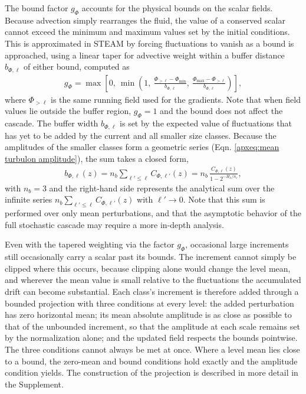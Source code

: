 \documentclass[acp, manuscript, english]{copernicus}
\begin{document}
The bound factor $g_\Phi$ accounts for the physical bounds on the scalar fields. Because advection simply rearranges the fluid, the value of a conserved scalar cannot exceed the minimum and maximum values set by the initial conditions. This is approximated in STEAM by forcing fluctuations to vanish as a bound is approached, using a linear taper for advective weight within a buffer distance $b_{\Phi,\ell}$ of either bound, computed as
\begin{align}
  g_\Phi = \max\left[0,\ \min\left(1,\ \frac{\Phi_{>\ell} - \Phi_{\min}}{b_{\Phi,\ell}},\ \frac{\Phi_{\max} - \Phi_{>\ell}}{b_{\Phi,\ell}}\right)\right], \label{apxeq:bound factor}
\end{align}
where $\Phi_{>\ell}$ is the same running field used for the gradients. Note that when field values lie outside the buffer region, $g_\Phi = 1$ and the bound does not affect the cascade. The buffer width $b_{\Phi,\ell}$ is set by the expected value of fluctuations that has yet to be added by the current and all smaller size classes. Because the amplitudes of the smaller classes form a geometric series (Eqn. \ref{apxeq:mean turbulon amplitude}), the sum takes a closed form,
\begin{align}
  b_{\Phi,\ell}(z) = n_b \sum_{\ell' \le \ell} C_{\Phi,\ell'}(z) = n_b\, \frac{C_{\Phi,\ell}(z)}{1 - 2^{-H_h/n_c}}, \label{apxeq:bound buffer}
\end{align}
with $n_b = 3$ and the right-hand side represents the analytical sum over the infinite series $n_b \sum_{\ell' \le \ell} C_{\Phi,\ell'}(z)$ with $\ell' \to 0$. Note that this sum is performed over only mean perturbations, and that the asymptotic behavior of the full stochastic cascade may require a more in-depth analysis.



Even with the tapered weighting via the factor $g_\Phi$, occasional large increments still occasionally carry a scalar past its bounds. The increment cannot simply be clipped where this occurs, because clipping alone would change the level mean, and wherever the mean value is small relative to the fluctuations the accumulated drift can become substantial. Each class's increment is therefore added through a bounded projection with three conditions at every level: the added perturbation has zero horizontal mean; its mean absolute amplitude is as close as possible to that of the unbounded increment, so that the amplitude at each scale remains set by the normalization alone; and the updated field respects the bounds pointwise. The three conditions cannot always be met at once. Where a level mean lies close to a bound, the zero-mean and bound conditions hold exactly and the amplitude condition yields. The construction of the projection is described in more detail in the Supplement.
\end{document}
